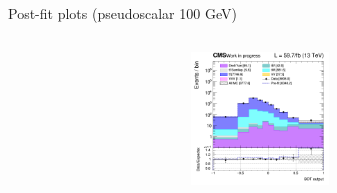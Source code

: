 \documentclass[8pt]{beamer}
\begin{document}
\begin{frame}{Post-fit plots (pseudoscalar 100 GeV)}
\begin{columns}
\begin{column}{0.33\textwidth}
\begin{center}
			\begin{block}{}\end{block}	
     			\includegraphics[width=1.0\textwidth, height=100pt]{figs/postfits/2018/log_cratio_ST_topCR_ll_BDT_tDM100_TTbar_BDT_output_pseudoscalar100_customBinsAttempt7.png}
    		\end{center}		
		\end{column}
\end{columns}


\end{frame}
\end{document}
